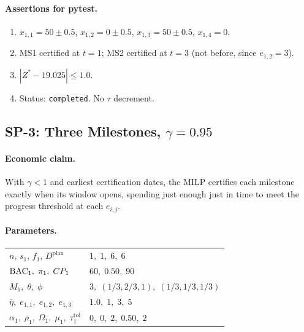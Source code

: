 \paragraph{Assertions for pytest.}
\begin{enumerate}[label=A\arabic*.]
  \item $x_{1,1}=50\pm0.5$, $x_{1,2}=0\pm0.5$, $x_{1,3}=50\pm0.5$,
    $x_{1,4}=0$.
  \item MS1 certified at $t=1$; MS2 certified at $t=3$ (not before,
    since $e_{1,2}=3$).
  \item $|Z^*-19.025|\leq1.0$.
  \item Status: \texttt{completed}. No $\tau$ decrement.
\end{enumerate}

\subsection{SP-3: Three Milestones, \texorpdfstring{$\gamma=0.95$}{gamma=0.95}}

\paragraph{Economic claim.}
With $\gamma<1$ and earliest certification dates, the MILP certifies
each milestone exactly when its window opens, spending just enough
just in time to meet the progress threshold at each $e_{i,j}$.

\paragraph{Parameters.}
\begin{center}
\begin{tabular}{ll}
\toprule
$n,\,s_1,\,f_1,\,D^{\mathrm{plan}}$ & $1,\;1,\;6,\;6$\\
$\mathrm{BAC}_1,\;\pi_1,\;CP_1$ & $60,\;0.50,\;90$\\
$M_1,\;\theta,\;\phi$ & $3,\;(1/3,2/3,1),\;(1/3,1/3,1/3)$\\
$\bar\eta,\;e_{1,1},\;e_{1,2},\;e_{1,3}$ & $1.0,\;1,\;3,\;5$\\
$\alpha_1,\;\rho_1,\;\Omega_1,\;\mu_1,\;\tau_1^{\mathrm{tol}}$ &
  $0,\;0,\;2,\;0.50,\;2$\\
\bottomrule
\end{tabular}
\end{center}

